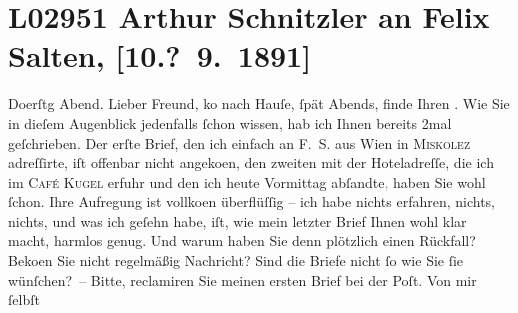 

\section[Arthur Schnitzler an Felix Salten, {[}10.? 9. 1891{]}]{L02951 Arthur Schnitzler an Felix Salten, {[}10.? 9. 1891{]}}
\nopagebreak{}
\rehead{ }\normalsize\beginnumbering{}
\toendnotes[C]{\smallbreak\pagebreak[2]}
\toendnotes[C]{\smallbreak}
\pstart
           \raggedleft{}{\pb}Do{\geminationn}erſtg{ }Abend. \pend
           \vspace{0.5em}
\pstart
           Lieber Freund, ko{\geminationm} nach
               Hauſe, ſpät Abends, finde Ihren \label{K_L02951-1v}\label{K_L02951-1}. Wie Sie in dieſem Augenblick jedenfalls ſchon wissen, hab ich Ihnen bereits
               2mal geſchrieben. Der erſte {\pb}Brief, den ich
               einfach an \textsc{F. S.} aus Wien in \textsc{Miskolez} adreſſirte, iſt offenbar nicht angeko{\geminationm}en, den
               zweiten mit der Hoteladreſſe, die ich im \textsc{Café Kugel} erfuhr und den ich heute{ }Vormittag abſandte\textcolor{gray}{,} haben Sie wohl ſchon. Ihre
               Aufregung ist vollko{\geminationm}en {\pb}überflüſſig – ich habe nichts erfahren,
               nichts, nichts, und was ich geſehn habe, iſt, wie mein letzter Brief Ihnen wohl klar
               macht, harmlos genug. Und warum haben Sie denn plötzlich einen Rückfall? Beko{\geminationm}en­ Sie nicht regelmäßig Nachricht? {\pb}Sind die Briefe nicht ſo wie Sie ſie
               wünſchen? – Bitte, reclamiren Sie meinen ersten Brief bei der Poſt. Von mir ſelbſt
